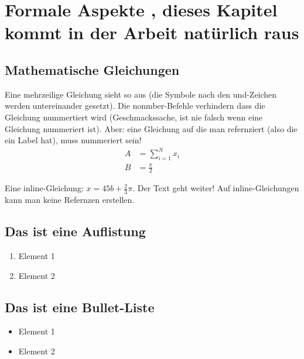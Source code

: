 \documentclass[12pt,oneside]{article}
\begin{document}
\clearpage
\def\UrlBreaks{\do\/\do-} %



\appendix

\section{Formale Aspekte , dieses Kapitel kommt in der Arbeit natürlich raus}
%
\subsection{Mathematische Gleichungen}
Eine mehrzeilige Gleichung sieht so aus (die Symbole nach den und-Zeichen werden untereinander gesetzt). Die nonmber-Befehle verhindern dass die Gleichung nummertiert wird (Geschmackssache, ist nie falsch wenn eine Gleichung nummeriert ist). Aber: eine Gleichung auf die man refernziert (also die ein Label hat), muss nummeriert sein!
\begin{align}
    A &= \sum_{i=1}^N x_i \label{eq:1}\nonumber\\
    B &= \frac{\pi}{2}
\end{align}

Eine inline-Gleichung: $x=45b + \frac{2}{3}\pi$. Der Text geht weiter! Auf inline-Gleichungen kann man keine Refernzen erstellen.

\subsection{Das ist eine Auflistung}
\begin{enumerate}
\item Element 1
\item Element 2
\end{enumerate}

\subsection{Das ist eine Bullet-Liste}
\begin{itemize}
\item Element 1
\item Element 2
\end{itemize}
\end{document}
